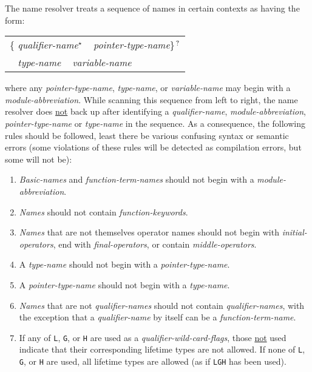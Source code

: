 \documentclass[12pt]{article}
\newcommand{\STAR}{{\Large $^\star$}}
\newcommand{\QMARK}{{$^{\,\mbox{\footnotesize ?}}$}}
\begin{document}
The name resolver treats a sequence of
names in certain contexts as having the form:
\begin{center}
\begin{tabular}{l}
\{ {\em qualifier-name}\STAR{} ~ {\em pointer-type-name}\}\QMARK{} \\
\hspace*{0.5in}{\em qualifier-name}\STAR{} ~
{\em type-name} ~ {\em variable-name}
\end{tabular}
\end{center}
where any {\em pointer-type-name}, {\em type-name}, or {\em variable-name}
may begin with a {\em module-abbre\-via\-tion}.
While scanning this sequence from left to right,
the name resolver does \underline{not} back up after identifying
a {\em qualifier-name}, {\em module-abbreviation}, {\em pointer-type-name}
or {\em type-name} in the sequence.  As a consequence, the
following rules should be followed, least there be
various confusing syntax or semantic errors (some
violations of these rules will be detected as compilation errors,
but some will not be):
\begin{enumerate}
\item\label{MODULE-ABBREVIATION-RULE}
{\em Basic-names} and {\em function-term-names}
should not begin with a {\em module-abbre\-viation}.
\item\label{FUNCTION-KEYWORD-RULE}
{\em Names} should not contain {\em function-keywords}.
\item\label{OPERATOR-RULE}
{\em Names} that are not themselves operator names should not
begin with {\em initial-operators},
end with {\em final-operators}, or contain {\em middle-operators}.
\item\label{TYPE-NAME-RULE}
A {\em type-name} should not begin with a {\em pointer-type-name}.
\item\label{POINTER-TYPE-NAME-RULE}
A {\em pointer-type-name} should not begin with a {\em type-name}.
\item\label{QUALIFIER-RULE}
{\em Names} that are not {\em qualifier-names}
should not contain {\em qualifier-names}, with the
exception that a {\em qualifier-name} by itself can be
a {\em function-term-name}.
\item\label{Q-FLAG-RULE}
If any of {\tt L}, {\tt G}, or {\tt H} are
used as a {\em qualifier-wild-card-flags}, those \underline{not} used
indicate that their corresponding lifetime types are not allowed.
If none of {\tt L}, {\tt G}, or {\tt H} are used,
all lifetime types are allowed (as if {\tt LGH} has been used).
\end{enumerate}
\end{document}
